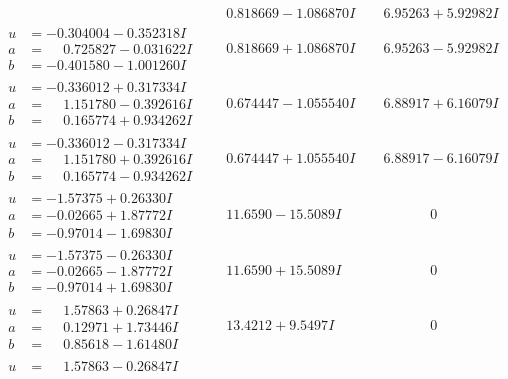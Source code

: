\documentclass[1p]{elsarticle_modified}
\theoremstyle{definition}
\begin{document}
$$\begin{array}{c|c|c}
 & \phantom{-}0.818669 - 1.086870 I & \phantom{-}6.95263 + 5.92982 I \\ \hline\begin{aligned}
u &= -0.304004 - 0.352318 I \\
a &= \phantom{-}0.725827 - 0.031622 I \\
b &= -0.401580 - 1.001260 I\end{aligned}
 & \phantom{-}0.818669 + 1.086870 I & \phantom{-}6.95263 - 5.92982 I \\ \hline\begin{aligned}
u &= -0.336012 + 0.317334 I \\
a &= \phantom{-}1.151780 - 0.392616 I \\
b &= \phantom{-}0.165774 + 0.934262 I\end{aligned}
 & \phantom{-}0.674447 - 1.055540 I & \phantom{-}6.88917 + 6.16079 I \\ \hline\begin{aligned}
u &= -0.336012 - 0.317334 I \\
a &= \phantom{-}1.151780 + 0.392616 I \\
b &= \phantom{-}0.165774 - 0.934262 I\end{aligned}
 & \phantom{-}0.674447 + 1.055540 I & \phantom{-}6.88917 - 6.16079 I \\ \hline\begin{aligned}
u &= -1.57375 + 0.26330 I \\
a &= -0.02665 + 1.87772 I \\
b &= -0.97014 - 1.69830 I\end{aligned}
 & \phantom{-}11.6590 - 15.5089 I & \phantom{-0.000000 } 0 \\ \hline\begin{aligned}
u &= -1.57375 - 0.26330 I \\
a &= -0.02665 - 1.87772 I \\
b &= -0.97014 + 1.69830 I\end{aligned}
 & \phantom{-}11.6590 + 15.5089 I & \phantom{-0.000000 } 0 \\ \hline\begin{aligned}
u &= \phantom{-}1.57863 + 0.26847 I \\
a &= \phantom{-}0.12971 + 1.73446 I \\
b &= \phantom{-}0.85618 - 1.61480 I\end{aligned}
 & \phantom{-}13.4212 + 9.5497 I & \phantom{-0.000000 } 0 \\ \hline\begin{aligned}
u &= \phantom{-}1.57863 - 0.26847 I \\

\end{aligned}
\end{array}$$
\end{document}
